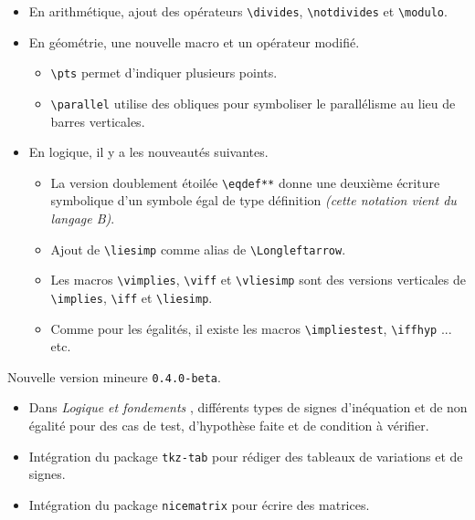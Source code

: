 \documentclass[12pt,a4paper]{article}
\begin{document}
\begin{description}[leftmargin=1em]
\begin{itemize}
        \item En arithmétique, ajout des opérateurs \verb+\divides+, \verb+\notdivides+ et \verb+\modulo+.

        \item En géométrie, une nouvelle macro et un opérateur modifié.
        \begin{itemize}
            \item \verb+\pts+ permet d'indiquer plusieurs points.

            \item \verb+\parallel+ utilise des obliques pour symboliser le parallélisme au lieu de barres verticales.
        \end{itemize}

        \item En logique, il y a les nouveautés suivantes.
        \begin{itemize}
            \item La version doublement étoilée \verb+\eqdef**+ donne une deuxième écriture symbolique d'un symbole égal de type définition \emph{(cette notation vient du langage B)}.

            \item Ajout de \verb+\liesimp+ comme alias de \verb+\Longleftarrow+.

            \item Les macros \verb+\vimplies+, \verb+\viff+ et \verb+\vliesimp+ sont des versions verticales de \verb+\implies+, \verb+\iff+ et \verb+\liesimp+.

            \item Comme pour les égalités, il existe les macros \verb+\impliestest+, \verb+\iffhyp+ ... etc.
        \end{itemize}
    \end{itemize}


    \item[2019-09-06]  Nouvelle version mineure \verb+0.4.0-beta+.
    \begin{itemize}
        \item Dans \emph{\og Logique et fondements \fg}, différents types de signes d'inéquation et de non égalité pour des cas de test, d'hypothèse faite et de condition à vérifier.

        \item Intégration du package \verb+tkz-tab+ pour rédiger des tableaux de variations et de signes.

        \item Intégration du package \verb+nicematrix+ pour écrire des matrices.
    \end{itemize}


\end{description}
\end{document}
